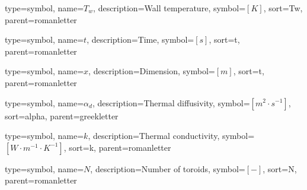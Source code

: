 {
	type=symbol, %
	name={\ensuremath{T_w}}, %
	description={Wall temperature}, %
	symbol={$\left[K\right]$}, %
	sort=Tw, %
	parent=romanletter %
}

{
	type=symbol, %
	name={\ensuremath{t}}, %
	description={Time}, %
	symbol={$\left[s\right]$}, %
	sort=t, %
	parent=romanletter %
}

{
	type=symbol, %
	name={\ensuremath{x}}, %
	description={Dimension}, %
	symbol={$\left[m\right]$}, %
	sort=t, %
	parent=romanletter %
}

{
	type=symbol, %
	name={\ensuremath{\alpha_d}}, %
	description={Thermal diffusivity}, %
	symbol={$\left[m^2\cdot s^{-1}\right]$}, %
	sort=alpha, %
	parent=greekletter %
}

{
	type=symbol, %
	name={\ensuremath{k}}, %
	description={Thermal conductivity}, %
	symbol={$\left[W\cdot m^{-1} \cdot K^{-1}\right]$}, %
	sort=k, %
	parent=romanletter %
}

{
	type=symbol, %
	name={\ensuremath{N}}, %
	description={Number of toroids}, %
	symbol={$\left[-\right]$}, %
	sort=N, %
	parent=romanletter %
}

